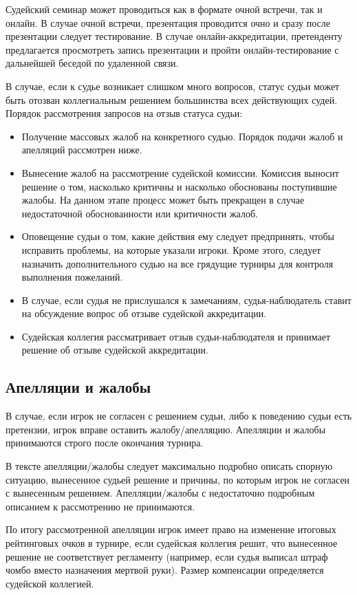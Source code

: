 Судейский семинар может проводиться как в формате очной встречи, так и онлайн. В случае очной встречи, презентация проводится очно и сразу после презентации следует тестирование. В случае онлайн-аккредитации, претенденту предлагается просмотреть запись презентации и пройти онлайн-тестирование с дальнейшей беседой по удаленной связи. 

В случае, если к судье возникает слишком много вопросов, статус судьи может быть отозван коллегиальным решением большинства всех действующих судей. Порядок рассмотрения запросов на отзыв статуса судьи:

\begin{itemize}
	\item Получение массовых жалоб на конкретного судью. Порядок подачи жалоб и апелляций рассмотрен ниже.
	\item Вынесение жалоб на рассмотрение судейской комиссии. Комиссия выносит решение о том, насколько критичны и насколько обоснованы поступившие жалобы. На данном этапе процесс может быть прекращен в случае недостаточной обоснованности или критичности жалоб.
	\item Оповещение судьи о том, какие действия ему следует предпринять, чтобы исправить проблемы, на которые указали игроки. Кроме этого, следует назначить дополнительного судью на все грядущие турниры для контроля выполнения пожеланий.
	\item В случае, если судья не прислушался к замечаниям, судья-наблюдатель ставит на обсуждение вопрос об отзыве судейской аккредитации.
	\item Судейская коллегия рассматривает отзыв судьи-наблюдателя и принимает решение об отзыве судейской аккредитации.
\end{itemize}

\subsection{Апелляции и жалобы}

В случае, если игрок не согласен с решением судьи, либо к поведению судьи есть претензии, игрок вправе оставить жалобу/апелляцию. Апелляции и жалобы принимаются строго после окончания турнира.

В тексте апелляции/жалобы следует максимально подробно описать спорную ситуацию, вынесенное судьей решение и причины, по которым игрок не согласен с вынесенным решением. Апелляции/жалобы с недостаточно подробным описанием к рассмотрению не принимаются.

По итогу рассмотренной апелляции игрок имеет право на изменение итоговых рейтинговых очков в турнире, если судейская коллегия решит, что вынесенное решение не соответствует регламенту (например, если судья выписал штраф чомбо вместо назначения мертвой руки). Размер компенсации определяется судейской коллегией. 

